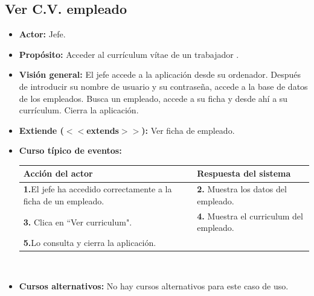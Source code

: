 \documentclass[spanish,a4paper,11pt, twoside]{report}	%
\begin{document}

	\subsection{Ver C.V. empleado}		
			\begin{itemize}
			\item \textbf{Actor:} Jefe.
			\item \textbf{Propósito:} Acceder al currículum vítae de un trabajador  .
			\item \textbf{Visión general:} El jefe accede a la aplicación desde su ordenador. Después de introducir su nombre de usuario y su contraseña, accede a la base de datos de los empleados. Busca un empleado, accede a su ficha y desde ahí a su currículum. Cierra la aplicación. 
			\item \textbf{Extiende ($<<$extends$>>$):} Ver ficha de empleado.
			\item \textbf{Curso típico de eventos:} 	\\
				\begin{tabular}{|p{6cm}||p{6cm}|}
				\hline
				\textbf{Acción del actor} & \textbf{Respuesta del sistema} \\ \hline \hline
				\textbf{1.}El jefe ha accedido correctamente a la ficha de un empleado. & \textbf{2.} Muestra los datos del empleado.\\ \hline
				\textbf{3.} Clica en “Ver curriculum".	& \textbf{4.} Muestra el curriculum del empleado. \\ \hline
				\textbf{5.}Lo consulta y cierra la aplicación. & \textbf{} \\ \hline
			\end{tabular}
			\\
			\item \textbf{Cursos alternativos:} No hay cursos alternativos para este caso de uso.
		\end{itemize}



\end{document}
